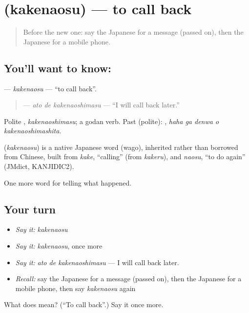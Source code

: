 \section[\texorpdfstring{\ja{かけなおす} (kakenaosu)}{かけなおす (kakenaosu)}]{ (kakenaosu) — to call back}

\label{lesson:JA-C307-kakenaosu}



\begin{quote}
Before the new one: say the Japanese for a message (passed on), then the Japanese for a mobile phone.
\end{quote}

\subsection*{You'll want to know: }
\textbf{} — \emph{kakenaosu} — \textquotedblleft{}to call back\textquotedblright{}.

\begin{quote}
\textbf{ } — \emph{ato de kakenaoshimasu} — \textquotedblleft{}I will call back later.\textquotedblright{}
\end{quote}

Polite \textbf{}, \emph{kakenaoshimasu}; a godan verb. Past (polite): \textbf{  }, \emph{haha ga denwa o kakenaoshimashita}.

\begin{cousinweb}
\textbf{} (\emph{kakenaosu}) is a native Japanese word (wago), inherited rather than borrowed from Chinese, built from \emph{kake}, \textquotedblleft{}calling\textquotedblright{} (from \emph{kakeru}), and \emph{naosu}, \textquotedblleft{}to do again\textquotedblright{} (JMdict, KANJIDIC2).
\end{cousinweb}

\begin{grammarlens}[title={What you've built}]
One more word for telling what happened.
\end{grammarlens}

\subsection*{Your turn}
\begin{itemize}
\raggedright
  \item \emph{Say it:} \emph{kakenaosu}
  \item \emph{Say it:} \emph{kakenaosu}, once more
  \item \emph{Say it:} \emph{ato de kakenaoshimasu} — I will call back later.
  \item \emph{Recall:} say the Japanese for a message (passed on), then the Japanese for a mobile phone, then say \emph{kakenaosu} again
\end{itemize}

\begin{tcolorbox}[breakable,colback=teal!4,colframe=teal!35!black,title={Before you move on}]
What does  mean? (\textquotedblleft{}To call back\textquotedblright{}.) Say it once more.
\end{tcolorbox}
